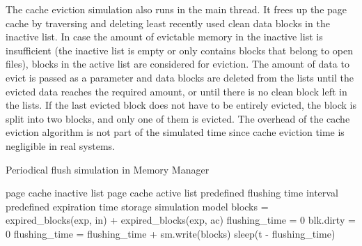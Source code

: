 \documentclass[conference]{IEEEtran}
\newcommand{\Desc}[2]{\State \makebox[2em][l]{#1}#2}
\newcommand{\tristan}[1]{\color{orange}\textbf{From Tristan:}#1\color{black}}
\begin{document}
    The cache eviction simulation also runs in
    the main thread. It frees up the page cache by traversing and deleting
    least recently used clean data blocks in the inactive list.
    In case the amount of evictable memory in the inactive list is insufficient 
    (the inactive list is empty or only contains blocks that belong to open files), 
    blocks in the active list are considered for eviction. 
    The amount of data to evict is passed as a parameter and data blocks are deleted
    from the lists until the evicted data reaches the required amount,
    or until there is no clean block left in the lists.
    If the last evicted block does not have to be entirely evicted, the block is split into two blocks,
    and only one of them is evicted.
    The overhead of the cache eviction algorithm is not part of the simulated time
    since cache eviction time is negligible in real systems. %

    \begin{algorithm}[b]\caption{Periodical flush simulation in Memory Manager}\label{alg:pdflush}
        \small
        \begin{algorithmic}[1]
            \Input
                \Desc{in}{page cache inactive list}
                \Desc{ac}{page cache active list}
                \Desc{t}{predefined flushing time interval}
                \Desc{exp}{predefined expiration time}
                \Desc{sm}{storage simulation model}
               \EndInput
                \State blocks = expired\_blocks(exp, in) + expired\_blocks(exp, ac)
                \State flushing\_time = 0
                  \State blk.dirty = 0 
                  \State flushing\_time = flushing\_time + sm.write(blocks)
                \EndFor
                    \State sleep(t - flushing\_time)
                \EndIf  
            \EndWhile
        \end{algorithmic}
    \end{algorithm}
\end{document}
